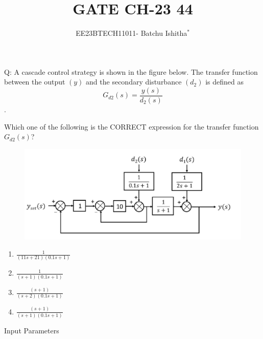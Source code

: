 \documentclass[journal,12pt,onecolumn]{IEEEtran}
\theoremstyle{remark}
\begin{document}
\let\vec\mathbf



\title{ GATE CH-23 44}
\author{EE23BTECH11011- Batchu Ishitha$^{*}$%
}
\maketitle




\bigskip

\renewcommand{\thefigure}{\theenumi}
\renewcommand{\thetable}{\theenumi}

Q: A cascade control strategy is shown in the figure below. The transfer function between the output $(y)$ and the secondary disturbance $(d_2)$ is defined as  \\


$$G_{d2}(s)= \frac{y(s)}{d_2(s)}$$. 


Which one of the following is the CORRECT expression for the transfer function $G_{d2}(s)$? \\

\begin{figure}[h]
    \centering
    \includegraphics[scale=0.25]{../gate23.ch.44/figs/g44fig1.jpeg}
    \caption{ }
    \label{}
\end{figure}

\begin{enumerate}[label=\Alph*.]
\item $\frac{1}{(11s+21)(0.1s+1)}$ 
\item $\frac{1}{(s+1)(0.1s+1)}$
\item $\frac{(s+1)}{(s+2)(0.1s+1)}$
\item $\frac{(s+1)}{(s+1)(0.1s+1)}$
\end{enumerate}

\solution 

\begin{table}[!ht]
    \centering
        
    \caption{Input Parameters}
    \label{tab: ishithagatech44.t1}
\end{table}
\end{document}
